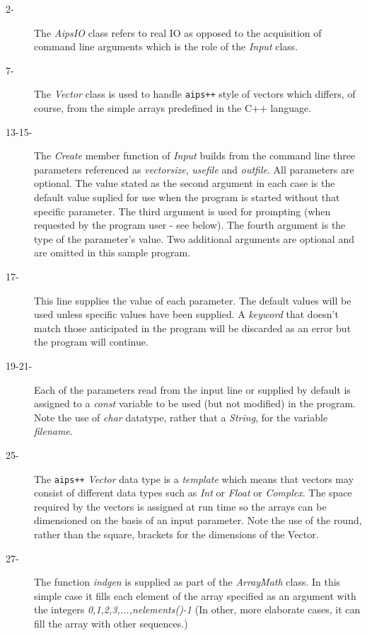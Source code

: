 \begin{description}
\item[2-] The {\em AipsIO} class refers to real IO as opposed to the acquisition of
command line arguments which is the role of the {\em Input} class. 

\item[7-] The {\em Vector} class is used to handle {\tt aips++} style of
vectors which differs, of course, from the simple arrays predefined in
the C++ language.

\item[13-15-] The {\em Create} member function of {\em Input} builds from the
command line three parameters referenced as {\em vectorsize},
{\em usefile} and {\em outfile}.  All parameters are optional.
The value stated as the second argument in each case is the
default value suplied for use when the program is started without
that specific parameter.
The third argument is used for prompting (when requested by the program
user - see below). The fourth argument is the type of the parameter's
value. Two additional arguments are optional and are omitted in this sample
program. 

\item[17-] This line supplies the value of each parameter. The default values
will be used unless specific values have been supplied. A
{\em keyword} that doesn't match those anticipated in the program will
be discarded as an error but the program will continue.

\item[19-21-] Each of the parameters read from the input line or supplied by
default is assigned to a {\em const} variable to be used (but not
modified) in the program. Note the use of {\em char} datatype, rather
that a {\em String}, for the variable {\em filename}.

\item[25-] The {\tt aips++} {\em Vector} data type is a {\em template} which means
that vectors may consist of different data types such as {\em Int} or
{\em Float} or {\em Complex}. The space required by the vectors is
assigned at run time so the arrays can be dimensioned on the basis of an
input parameter.  Note the use of the round, rather than the square,
brackets for the dimensions of the Vector.

\item[27-] The function {\em indgen} is supplied as part of the {\em ArrayMath}
class. In this simple case it fills each element of the array specified as
an argument with the integers {\em 0,1,2,3,...,nelements()-1} (In other,
more elaborate cases, it can fill the array with other sequences.)


\end{description}
